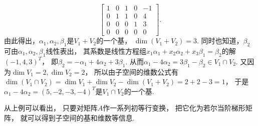 \begin{example}
\begin{solution}
\begin{equation*}
\begin{bmatrix}
		1 & 0 & 1 & 0 & -1 \\
		0 & 1 & 1 & 0 & 4 \\
		0 & 0 & 0 & 1 & 3 \\
		0 & 0 & 0 & 0 & 0
	\end{bmatrix}.
\end{equation*}
由此得出，\(\alpha_1,\alpha_2,\beta_1\)是\(V_1+V_2\)的一个基，
\(\dim(V_1+V_2)=3\).
同时也知道，\(\beta_2\)可由\(\alpha_1,\alpha_2,\beta_1\)线性表出，
其系数是线性方程组\(x_1\alpha_1+x_2\alpha_2+x_3\beta_1=\beta_2\)的解\((-1,4,3)^T\)，
即\(\beta_2=-\alpha_1+4\alpha_2+3\beta_1\).
从而\(\alpha_1-4\alpha_2=3\beta_1-\beta_2\in V_1 \cap V_2\).
又因为\(\dim V_1=2,
\dim V_2=2\)，
所以由子空间的维数公式有
\(\dim(V_1 \cap V_2)
=\dim V_1+\dim V_2-\dim(V_1+V_2)
=2+2-3=1\)，
于是\(\alpha_1-4\alpha_2=(5,-2,-3,-4)^T\)是\(V_1 \cap V_2\)的一个基.
\end{solution}
\end{example}

从上例可以看出，
只要对矩阵\(A\)作一系列初等行变换，
把它化为若尔当阶梯形矩阵，
就可以得到子空间的基和维数等信息.
